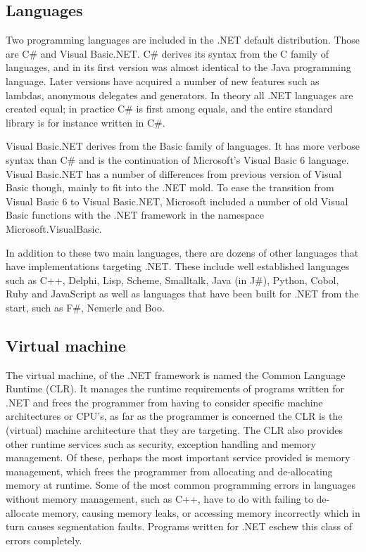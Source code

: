 \subsection{Languages}
	
	Two programming languages are included in the .NET default distribution. Those
	are C\# and Visual Basic.NET. C\# derives its syntax from the C family of 
	languages, and in its first version was almost identical to the Java 
	programming language. Later versions have acquired a number of new features 
	such as lambdas, anonymous delegates and generators. In theory all .NET 
	languages are created equal; in practice C\# is first among equals, and the 
	entire standard library is for instance written in C\#. 

	Visual Basic.NET derives from the Basic family of languages. It has more 
	verbose syntax than C\# and is the continuation of Microsoft's Visual Basic 6 
	language. Visual Basic.NET has a number of differences from previous version 
	of Visual Basic though, mainly to fit into the .NET mold. To ease the 
	transition from Visual Basic 6 to Visual Basic.NET, Microsoft included a 
	number of old Visual Basic functions with the .NET framework in the namespace 
	Microsoft.VisualBasic. 
	
	In addition to these two main languages, there are dozens of other 
	languages that have implementations targeting .NET. These include well 
	established languages such as C++, Delphi, Lisp, Scheme, Smalltalk, Java 
	(in J\#), Python, Cobol, Ruby and JavaScript as well as languages that have 
	been built for .NET from the start, such as F\#, Nemerle and Boo.

\subsection{Virtual machine}

	The virtual machine, of the .NET framework is named the Common Language 
	Runtime (CLR). It manages the runtime requirements of programs written for 
	.NET and frees the programmer from having to consider specific machine 
	architectures or CPU's, as far as the programmer is concerned the CLR is the 
	(virtual) machine architecture that they are targeting. The CLR also provides 
	other runtime services such as security, exception handling and memory 
	management. Of these, perhaps the most important service provided is memory 
	management, which frees the programmer from allocating and de-allocating 
	memory at runtime. Some of the most common programming errors in languages 
	without memory management, such as C++, have to do with failing to de-allocate 
	memory, causing memory leaks, or accessing memory incorrectly which in turn 
	causes segmentation faults. Programs written for .NET eschew this class of 
	errors completely.
	
